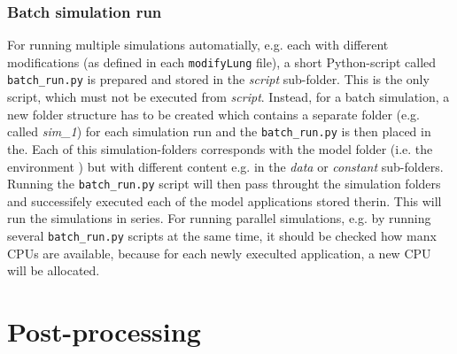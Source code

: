 \subsubsection{Batch simulation run}
For running multiple simulations automatially, e.g. each with different modifications (as defined in each \texttt{modifyLung} file), a short Python-script called \texttt{batch\_run.py} is prepared and stored in the \textit{script} sub-folder.
This is the only script, which must not be executed from \textit{script}.
Instead, for a batch simulation, a new folder structure has to be created which contains a separate folder (e.g. called \textit{sim\_1}) for each simulation run and the \texttt{batch\_run.py} is then placed in the.
Each of this simulation-folders corresponds with the model folder (i.e. the environment ) but with different content e.g. in the \textit{data} or \textit{constant} sub-folders.
Running the \texttt{batch\_run.py} script will then pass throught the simulation folders and successifely executed each of the model applications stored therin.
This will run the simulations in series.
For running parallel simulations, e.g. by running several \texttt{batch\_run.py} scripts at the same time, it should be checked how manx CPUs are available, because for each newly execulted application, a new CPU will be allocated.



\section{Post-processing} \label{sec:post_processing}
